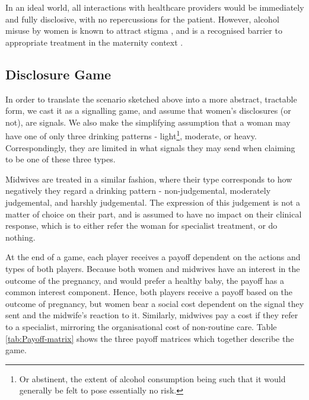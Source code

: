 In an ideal world, all interactions with healthcare providers would be immediately and fully disclosive, with no repercussions for the patient. However, alcohol misuse by women is known to attract stigma \citep{Gomberg1988}, and is a recognised barrier to appropriate treatment in the maternity context \citep{NICE2010,Radcliffe2011}.

\subsection{Disclosure Game}
\label{sub:the_game}

In order to translate the scenario sketched above into a more abstract, tractable form, we cast it as a signalling game, and assume that women's disclosures (or not), are signals. We also make the simplifying assumption that a woman may have one of only three drinking patterns - light\footnote{Or abstinent, the extent of alcohol consumption being such that it would generally be felt to pose essentially no risk.}, moderate, or heavy. Correspondingly, they are limited in what signals they may send when claiming to be one of these three types. 

Midwives are treated in a similar fashion, where their type corresponds to how negatively they regard a drinking pattern - non-judgemental, moderately judgemental, and harshly judgemental. The expression of this judgement is not a matter of choice on their part, and is assumed to have no impact on their clinical response, which is to either refer the woman for specialist treatment, or do nothing.

At the end of a game, each player receives a payoff dependent on the actions and types of both players. Because both women and midwives have an interest in the outcome of the pregnancy, and would prefer a healthy baby, the payoff has a common interest component. Hence, both players receive a payoff based on the outcome of pregnancy, but women bear a social cost dependent on the signal they sent and the midwife's reaction to it. Similarly, midwives pay a cost if they refer to a specialist, mirroring the organisational cost of non-routine care. Table \ref{tab:Payoff-matrix} shows the three payoff matrices which together describe the game.

